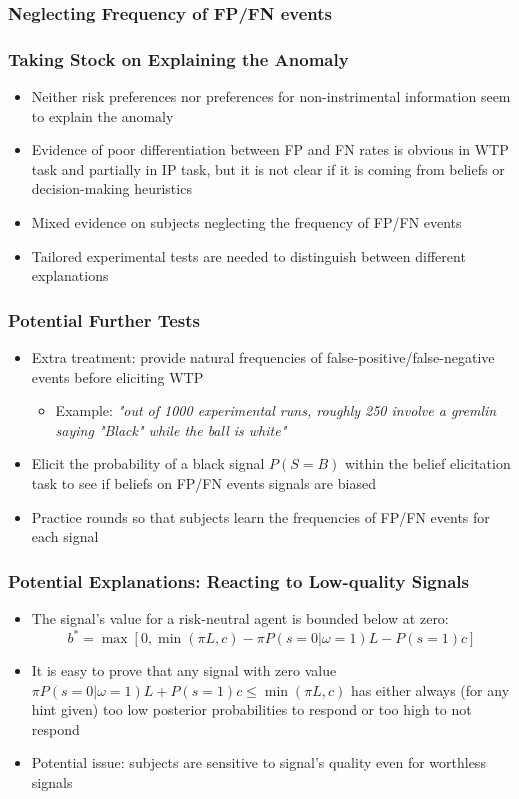 \documentclass[11pt,hyperref={bookmarks=false}]{beamer}
\begin{document}
\begin{frame}
\frametitle{Neglecting Frequency of FP/FN events}
\scriptsize

\end{frame}


\begin{frame}
\frametitle{Taking Stock on Explaining the Anomaly}
\begin{itemize}
\item Neither risk preferences nor preferences for non-instrimental information seem to explain the anomaly
\item Evidence of poor differentiation between FP and FN rates is obvious in WTP task and partially in IP task, but it is not clear if it is coming from beliefs or decision-making heuristics
\item Mixed evidence on subjects neglecting the frequency of FP/FN events
\item Tailored experimental tests are needed to distinguish between different explanations 
\end{itemize}
\end{frame}



\begin{frame}
\frametitle{Potential Further Tests}
\begin{itemize}
\item Extra treatment: provide natural frequencies of false-positive/false-negative events before eliciting WTP
\begin{itemize}
\item Example: \textit{"out of 1000 experimental runs, roughly 250 involve a gremlin saying "Black" while the ball is white"}
\end{itemize}
\item Elicit the probability of a black signal $P(S=B)$ within the belief elicitation task to see if beliefs on FP/FN events signals are biased
\item Practice rounds so that subjects learn the frequencies of FP/FN events for each signal
\end{itemize}
\end{frame}





\iffalse


\begin{frame}
\frametitle{Potential Explanations: Reacting to Low-quality Signals}
\begin{itemize}
\item The signal's value for a risk-neutral agent is bounded below at zero: 
$$b^*=\max[0,\min(\pi L, c)-\pi P(s=0|\omega=1)L-P(s=1)c]$$
\item It is easy to prove that any signal with zero value $\pi P(s=0|\omega=1)L+P(s=1)c\leq \min(\pi L, c)$ has either always (for any hint given) too low posterior probabilities to respond or too high to not respond
\item Potential issue: subjects are sensitive to signal's quality even for worthless signals
\end{itemize}
\end{frame}
\end{document}
